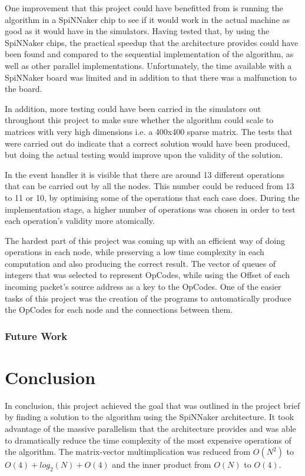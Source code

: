 \documentclass[12pt,a4paper]{article}
\begin{document}
One improvement that this project could have benefitted from is running the algorithm in a SpiNNaker chip to see if it would work in the actual machine as good as it would have in the simulators. Having tested that, by using the SpiNNaker chips, the practical speedup that the architecture provides could have been found and compared to the sequential implementation of the algorithm, as well as other parallel implementations. Unfortunately, the time available with a SpiNNaker board was limited and in addition to that there was a malfunction to the board.

In addition, more testing could have been carried in the simulators out throughout this project to make sure whether the algorithm could scale to matrices with very high dimensions i.e. a 400x400 sparse matrix. The tests that were carried out do indicate that a correct solution would have been produced, but doing the actual testing would improve upon the validity of the solution.

In the event handler it is visible that there are around 13 different operations that can be carried out by all the nodes. This number could be reduced from 13 to 11 or 10, by optimising some of the operations that each case does. During the implementation stage, a higher number of operations was chosen in order to test each operation's validity more atomically.

The hardest part of this project was coming up with an efficient way of doing operations in each node, while preserving a low time complexity in each computation and also producing the correct result. The vector of queues of integers that was selected to represent OpCodes, while using the Offset of each incoming packet's source address as a key to the OpCodes. One of the easier tasks of this project was the creation of the programs to automatically produce the OpCodes for each node and the connections between them.
\subsubsection{Future Work}
\section{Conclusion}
In conclusion, this project achieved the goal that was outlined in the project brief by finding a solution to the algorithm using the SpiNNaker architecture. It took advantage of the massive parallelism that the architecture provides and was able to dramatically reduce the time complexity of the most expensive operations of the algorithm. The matrix-vector multimplication was reduced from $O(N^2)$ to $O(4) + log_2(N) + O(4)$ and the inner product from $O(N)$ to $O(4)$. 
\end{document}
